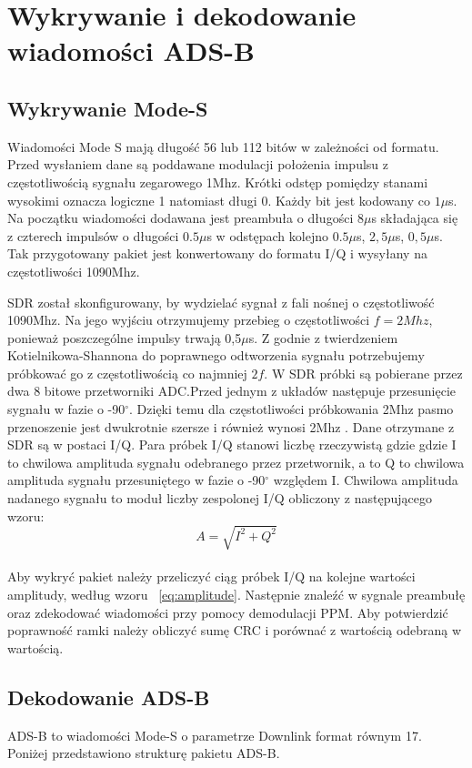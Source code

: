 \documentclass[eng,printmode]{mgr}
\begin{document}
\section{Wykrywanie i dekodowanie wiadomości ADS-B}
\subsection*{Wykrywanie Mode-S}
Wiadomości Mode S mają długość 56 lub 112 bitów w zależności od formatu. Przed wysłaniem dane są poddawane modulacji położenia impulsu z częstotliwością sygnału zegarowego 1Mhz. Krótki odstęp pomiędzy stanami wysokimi oznacza logiczne 1 natomiast długi 0. 
Każdy bit jest kodowany co $1\mu$s. Na początku wiadomości dodawana jest preambuła o długości $8\mu$s składająca się z czterech impulsów o długości $0.5\mu$s w odstępach kolejno $0.5\mu$s, $2,5\mu$s, $0,5\mu$s. Tak przygotowany pakiet jest konwertowany do formatu I/Q i wysyłany na częstotliwości 1090Mhz.


SDR został skonfigurowany, by wydzielać sygnał z fali nośnej o częstotliwość 1090Mhz.
Na jego wyjściu otrzymujemy przebieg o częstotliwości $f=2Mhz$, ponieważ poszczególne impulsy trwają 0,5$\mu$s. Z godnie z twierdzeniem Kotielnikowa-Shannona do poprawnego odtworzenia sygnału potrzebujemy próbkować go z częstotliwością co najmniej $2f$. W SDR próbki są pobierane przez dwa 8 bitowe przetworniki ADC.Przed jednym z układów następuje przesunięcie sygnału w fazie o -90$^\circ$. Dzięki temu dla częstotliwości próbkowania 2Mhz pasmo przenoszenie jest dwukrotnie szersze i również wynosi 2Mhz \cite{digit}. Dane otrzymane z SDR są w postaci I/Q. Para próbek I/Q stanowi liczbę rzeczywistą gdzie gdzie I to chwilowa amplituda sygnału odebranego przez przetwornik, a to Q to chwilowa amplituda sygnału przesuniętego w fazie o -90$^\circ$ względem I. Chwilowa amplituda nadanego sygnału to moduł liczby zespolonej I/Q obliczony z następującego wzoru:
\\
\begin{equation}
\label{eq:amplitude}
A = \sqrt{I^2 + Q^2}
\end{equation}
\\
Aby wykryć pakiet należy przeliczyć ciąg próbek I/Q na kolejne wartości amplitudy, według wzoru ~\ref{eq:amplitude}. Następnie znaleźć w sygnale preambułę oraz zdekodować wiadomości przy pomocy demodulacji PPM. Aby potwierdzić poprawność ramki należy obliczyć sumę CRC i porównać z wartością odebraną w wartością.
\\

\subsection*{Dekodowanie ADS-B}
ADS-B to wiadomości Mode-S o parametrze Downlink format równym 17. Poniżej przedstawiono strukturę pakietu ADS-B.
\end{document}
